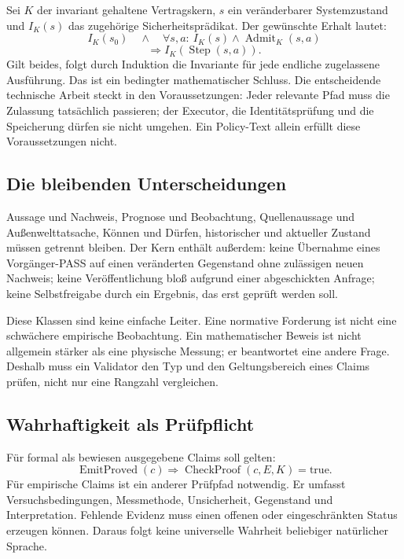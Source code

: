 \begin{cols}
Sei $K$ der invariant gehaltene Vertragskern, $s$ ein veränderbarer Systemzustand und $I_K(s)$ das zugehörige Sicherheitsprädikat. Der gewünschte Erhalt lautet:
\[
 I_K(s_0)\quad\land\quad
 \forall s,a:\ I_K(s)\land\operatorname{Admit}_K(s,a)
\]
\[
 \Longrightarrow I_K(\operatorname{Step}(s,a)).
\]
Gilt beides, folgt durch Induktion die Invariante für jede endliche zugelassene Ausführung. Das ist ein bedingter mathematischer Schluss. Die entscheidende technische Arbeit steckt in den Voraussetzungen: Jeder relevante Pfad muss die Zulassung tatsächlich passieren; der Executor, die Identitätsprüfung und die Speicherung dürfen sie nicht umgehen. Ein Policy-Text allein erfüllt diese Voraussetzungen nicht.

\subsection*{Die bleibenden Unterscheidungen}
Aussage und Nachweis, Prognose und Beobachtung, Quellenaussage und Außenwelttatsache, Können und Dürfen, historischer und aktueller Zustand müssen getrennt bleiben. Der Kern enthält außerdem: keine Übernahme eines Vorgänger-PASS auf einen veränderten Gegenstand ohne zulässigen neuen Nachweis; keine Veröffentlichung bloß aufgrund einer abgeschickten Anfrage; keine Selbstfreigabe durch ein Ergebnis, das erst geprüft werden soll. 

Diese Klassen sind keine einfache Leiter. Eine normative Forderung ist nicht eine schwächere empirische Beobachtung. Ein mathematischer Beweis ist nicht allgemein stärker als eine physische Messung; er beantwortet eine andere Frage. Deshalb muss ein Validator den Typ und den Geltungsbereich eines Claims prüfen, nicht nur eine Rangzahl vergleichen.

\subsection*{Wahrhaftigkeit als Prüfpflicht}
Für formal als bewiesen ausgegebene Claims soll gelten:
\[
\operatorname{EmitProved}(c)\Rightarrow
\operatorname{CheckProof}(c,E,K)=\mathrm{true}.
\]
Für empirische Claims ist ein anderer Prüfpfad notwendig. Er umfasst Versuchsbedingungen, Messmethode, Unsicherheit, Gegenstand und Interpretation. Fehlende Evidenz muss einen offenen oder eingeschränkten Status erzeugen können. Daraus folgt keine universelle Wahrheit beliebiger natürlicher Sprache.


\end{cols}
